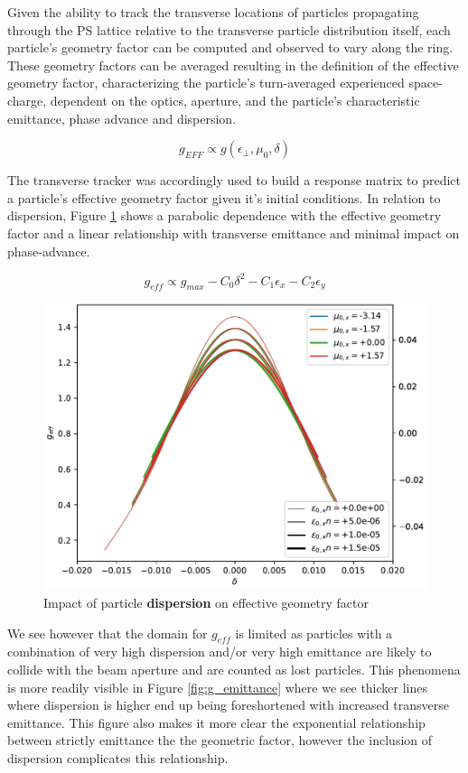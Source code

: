 Given the ability to track the transverse locations of particles propagating through the PS lattice relative to the transverse particle distribution itself, each particle's geometry factor can be computed and observed to vary along the ring. These geometry factors can be averaged resulting in the definition of the effective geometry factor, characterizing the particle's turn-averaged experienced space-charge, dependent on the optics, aperture, and the particle's characteristic emittance, phase advance and dispersion.

$$g_{EFF} \propto g(\epsilon_\perp, \mu_0, \delta)$$

The transverse tracker was accordingly used to build a response matrix to predict a particle's effective geometry factor given it's initial conditions. In relation to dispersion, Figure \ref{fig:g_eff_dispersion} shows a parabolic dependence with the effective geometry factor and a linear relationship with transverse emittance and minimal impact on phase-advance.

$$g_{eff} \propto g_{max} - C_0\delta^2 - C_1\epsilon_x - C_2\epsilon_y$$

\begin{figure}
    \centering
    \includegraphics{figs/g_dispersion.pdf}
    \caption{Impact of particle \textbf{dispersion} on effective geometry factor}
    \label{fig:g_eff_dispersion}
\end{figure}

We see however that the domain for $g_{eff}$ is limited as particles with a combination of very high dispersion and/or very high emittance are likely to collide with the beam aperture and are counted as lost particles. This phenomena is more readily visible in Figure \ref{fig:g_emittance} where we see thicker lines where dispersion is higher end up being foreshortened with increased transverse emittance. This figure also makes it more clear the exponential relationship between strictly emittance the the geometric factor, however the inclusion of dispersion complicates this relationship.

